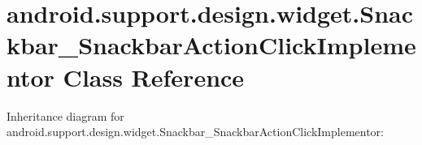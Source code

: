 \hypertarget{classandroid_1_1support_1_1design_1_1widget_1_1_snackbar___snackbar_action_click_implementor}{}\section{android.\+support.\+design.\+widget.\+Snackbar\+\_\+\+Snackbar\+Action\+Click\+Implementor Class Reference}
\label{classandroid_1_1support_1_1design_1_1widget_1_1_snackbar___snackbar_action_click_implementor}


Inheritance diagram for android.\+support.\+design.\+widget.\+Snackbar\+\_\+\+Snackbar\+Action\+Click\+Implementor\+:
